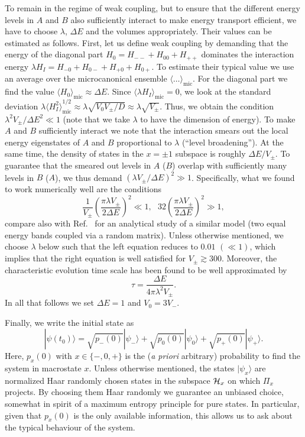 \documentclass[pre,onecolumn,12pt,aps,longbibliography,nofootinbib]{revtex4-2}
\newcommand{\C}[1]{{\cal{#1}}}
\newcommand{\lr}[1]{{\langle {#1}\rangle}}
\begin{document}
To remain in the regime of weak coupling, but to ensure that the different energy levels in $A$ and $B$ also sufficiently interact to make energy transport efficient, we have to choose $\lambda$, $\Delta E$ and the volumes appropriately. Their values can be estimated as follows. First, let us define weak coupling by demanding that the energy of the diagonal part $H_0 = H_{--} + H_{00} + H_{++}$ dominates the interaction energy $\lambda H_I = H_{-0} + H_{0-} + H_{+0} + H_{0+}$. To estimate their typical value we use an average over the microcanonical ensemble $\lr{\dots}_\text{mic}$. For the diagonal part we find the value $\lr{H_0}_\text{mic} \approx \Delta E$. Since $\lr{\lambda H_I}_\text{mic} = 0$, we look at the standard deviation $\lambda\lr{H_I^2}_\text{mic}^{1/2} \approx \lambda \sqrt{V_0V_\pm/D} \approx \lambda\sqrt{V_\pm}$. Thus, we obtain the condition $\lambda^2V_\pm/\Delta E^2 \ll 1$ (note that we take $\lambda$ to have the dimension of energy). To make $A$ and $B$ sufficiently interact we note that the interaction smears out the local energy eigenstates of $A$ and $B$ proportional to $\lambda$ (``level broadening''). At the same time, the density of states in the $x=\pm1$ subspace is roughly $\Delta E/V_\pm$. To guarantee that the smeared out levels in $A$ ($B$) overlap with sufficiently many levels in $B$ ($A$), we thus demand $(\lambda V_\pm/\Delta E)^2 \gg1$. Specifically, what we found to work numerically well are the conditions
\begin{equation}\label{eq conditions epsilon}
 \frac{1}{V_\pm}\left(\frac{\pi\lambda V_\pm}{2\Delta E}\right)^2 \ll 1, ~~~
 32\left(\frac{\pi\lambda V_\pm}{2\Delta E}\right)^2 \gg 1,
\end{equation}
compare also with Ref.~\cite{BartschSteinigewegGemmerPRE2008} for an analytical study of a similar model (two equal energy bands coupled via a random matrix). Unless otherwise mentioned, we choose $\lambda$ below such that the left equation reduces to $0.01$ $(\ll 1)$, which implies that the right equation is well satisfied for $V_\pm\gtrsim300$. Moreover, the characteristic evolution time scale has been found to be well approximated by
\begin{equation}\label{eq tau}
 \tau = \frac{\Delta E}{4\pi\lambda^2V_\pm}.
\end{equation}
In all that follows we set $\Delta E = 1$ and $V_0 = 3V_-$.

Finally, we write the initial state as
\begin{equation}\label{eq initial state}
 |\psi(t_0)\rangle = \sqrt{p_-(0)}|\psi_-\rangle + \sqrt{p_0(0)}|\psi_0\rangle + \sqrt{p_+(0)}|\psi_+\rangle.
\end{equation}
Here, $p_x(0)$ with $x\in\{-,0,+\}$ is the (\emph{a priori} arbitrary) probability to find the system in macrostate $x$. Unless otherwise mentioned, the states $|\psi_x\rangle$ are normalized Haar randomly chosen states in the subspace $\C H_x$ on which $\Pi_x$ projects. By choosing them Haar randomly we guarantee an unbiased choice, somewhat in spirit of a maximum entropy principle for pure states. In particular, given that $p_x(0)$ is the only available information, this allows us to ask about the typical behaviour of the system.
\end{document}

